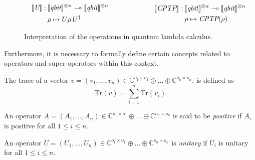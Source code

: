 \begin{figure}[H]
\begin{equation*}
\begin{split}
\begin{aligned}
  \\
  &
  \hspace{10pt}
  \begin{minipage}[t]{0.45\textwidth}
    $\begin{aligned}
      [\![\textit{U} ]\!] : \hspace{2pt} & \llbracket \textit{qbit} \rrbracket^{\otimes n} \multimap \llbracket 
      \textit{qbit} \rrbracket^{\otimes n} \\
      & \rho \mapsto U \rho \hspace{2pt}  U^{\dag}
    \end{aligned}$
    \end{minipage}
    \hspace{20pt} 
  \begin{minipage}[t]{0.45\textwidth}
    $\begin{aligned}
      [\![\textit{CPTP} ]\!] : \hspace{2pt} & \llbracket \textit{qbit} \rrbracket^{\otimes n} \multimap \llbracket 
      \textit{qbit} \rrbracket^{\otimes n} \\
      & \rho \mapsto \textit{CPTP} (\rho)
    \end{aligned}$
    \end{minipage} \\
\end{aligned}
\end{split}
\end{equation*}
\caption{Interpretation of the operations in quantum lambda calculus.}
\label{fig:interpret_ops}
\end{figure}

Furthermore, it is necessary to formally define certain concepts related to operators and super-operators within this context.
 
 \begin{definition} \label{def:trace_direct_sum}
  The trace of a vector $v = (v_1, \ldots, v_n) \in \mathbb{C}^{o_1 \times o_1} \oplus \ldots \oplus \mathbb{C}^{o_n \times o_n}$, is defined as 
\begin{equation}
  \text{Tr}(v)=\sum_{i=1}^{n} \text{Tr}(v_i)
\end{equation}
 \end{definition}
 \begin{definition}\label{def:positive_op_direct_sum}
  An operator $A = (A_1, \ldots, A_n) \in \mathbb{C}^{o_1 \times o_1} \oplus \ldots \oplus \mathbb{C}^{o_n \times o_n}$ is said to be \emph{positive} if $A_i$ is positive for all $ 1 \leq i \leq n $.
 \end{definition}
  \begin{definition}\label{def:unitary_direct_sum}
    An operator $U = (U_1, \ldots, U_n) \in \mathbb{C}^{o_1 \times o_1} \oplus \ldots \oplus \mathbb{C}^{o_n \times o_n}$ is  \emph{unitary} if $U_i$ is unitary for all $ 1 \leq i \leq n $.
  \end{definition}

